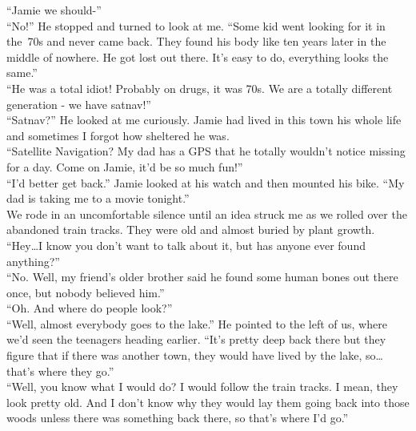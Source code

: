 \documentclass[a5paper]{scrartcl}
\begin{document}
\enquote{Jamie we should-}\\


\enquote{No!} He stopped and turned to look at me. \enquote{Some kid went looking for it in the~70s and never came back. They found his body like ten years later in the middle of nowhere. He got lost out there. It's easy to do, everything looks the same.}\\


\enquote{He was a total idiot! Probably on drugs, it was 70s. We are a totally different generation - we have satnav!}\\

\enquote{Satnav?} He looked at me curiously. Jamie had lived in this 
town his whole life and sometimes I forgot how sheltered he was.\\

\enquote{Satellite Navigation? My dad has a GPS that he totally wouldn't notice missing for a day. Come on Jamie, it'd be so much fun!}\\


\enquote{I'd better get back.} Jamie looked at his watch and then mounted his bike. \enquote{My dad is taking me to a movie tonight.} \\


We rode in an uncomfortable silence until an idea struck me as we rolled over the abandoned train tracks. They were old and almost buried by plant growth. \\


\enquote{Hey\dots I know you don't want to talk about it, but has anyone ever found anything?}\\


\enquote{No. Well, my friend's older brother said he found some human bones out there once, but nobody believed him.}\\


\enquote{Oh. And where do people look?}\\


\enquote{Well, almost everybody goes to the lake.} He pointed to the left of us, where we'd seen the teenagers heading earlier. \enquote{It's pretty deep back there but they figure that if there was another town, they would have lived by the lake, so\dots that's where they go.}   \\


\enquote{Well, you know what I would do? I would follow the train tracks. I mean, they look pretty old. And I don't know why they would lay them going back into those woods unless there was something back there, so that's where I'd go.}\\
\end{document}
